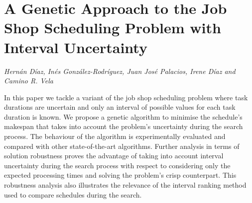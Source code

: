 \documentclass[../booklet.tex]{subfiles}
\begin{document}
\section[A Genetic Approach to the Job Shop Scheduling Problem with Interval Uncertainty. {\it Hernán Díaz, Inés González-Rodríguez, Juan José Palacios, Irene Díaz and Camino R. Vela}]{A Genetic Approach to the Job Shop Scheduling Problem with Interval Uncertainty}
    

\begin{center}
  {\it Hernán Díaz, Inés González-Rodríguez, Juan José Palacios, Irene Díaz and Camino R. Vela}
\end{center}

\vskip 0.8cm


In this paper we tackle a variant of the job shop scheduling problem where task durations are uncertain and only an interval of possible values for each task duration is known. We propose a genetic algorithm to minimise the schedule's makespan that takes into account the problem's uncertainty during the search process. The behaviour of the algorithm is experimentally evaluated  and compared with other state-of-the-art algorithms. Further analysis in terms of solution robustness proves the advantage of taking into account interval uncertainty during the search process with respect to considering only the expected processing times and solving the problem's crisp counterpart. This robustness analysis also illustrates the relevance of the interval ranking method used to compare schedules during the search.
\end{document}
